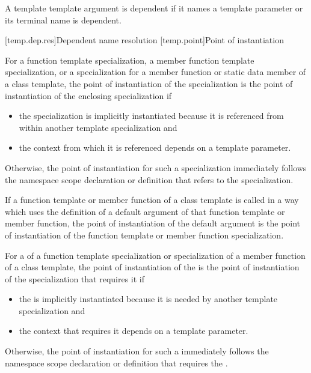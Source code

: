 \pnum
A template template argument is dependent if
it names a template parameter or
its terminal name is dependent.

[temp.dep.res]{Dependent name resolution}
[temp.point]{Point of instantiation}

\pnum
{}%
For a function template specialization, a member function template
specialization, or a specialization for a member function or static data member
of a class template,
the point of instantiation of the specialization is the point of instantiation
of the enclosing specialization if
\begin{itemize}
\item the specialization is implicitly instantiated
because it is referenced from within another template specialization and
\item the context from which it is referenced depends on a template parameter.
\end{itemize}
Otherwise, the point of instantiation for such a specialization immediately
follows the namespace scope declaration
or definition that refers to the specialization.

\pnum
If a function template or member function of a class template is called
in a way which uses the definition of a default argument of that function
template or member function,
the point of instantiation of the default argument is the point of
instantiation of the function template or member function specialization.

\pnum
For a  of a function template
specialization or specialization of a member function of a class template,
the point of instantiation of the
 is the point of instantiation of the
specialization that requires it if
\begin{itemize}
\item the  is implicitly instantiated
because it is needed by another template specialization and
\item the context that requires it depends on a template parameter.
\end{itemize}
Otherwise, the point of instantiation for such
a  immediately follows the namespace
scope declaration or definition that requires the
.

